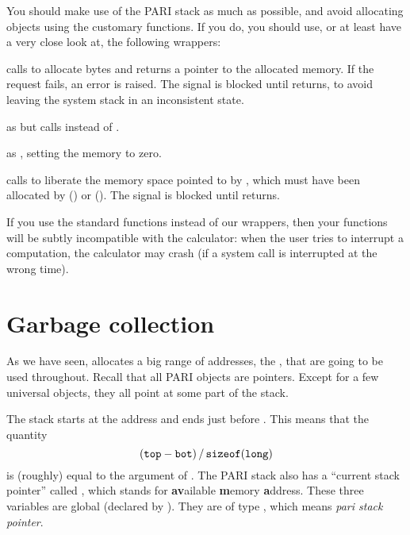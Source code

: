 You should make use of the PARI stack as much as possible, and avoid
allocating objects using the customary functions. If you do, you should
use, or at least have a very close look at, the following wrappers:

 calls  to allocate
 bytes and returns a pointer to the allocated memory. If the
request fails, an error is raised. The  signal is blocked until
 returns, to avoid leaving the system stack in an inconsistent
state.

 as  but
calls  instead of .

 as , setting the
memory to zero.

 calls  to liberate the memory
space pointed to by , which must have been allocated by 
() or  (). The 
signal is blocked until  returns.

If you use the standard  functions instead of our wrappers, then
your functions will be subtly incompatible with the  calculator: when
the user tries to interrupt a computation, the calculator may crash
(if a system call is interrupted at the wrong time).

\section{Garbage collection}\label{se:garbage}


\noindent
As we have seen,  allocates a big range of
addresses, the , that are going to be used throughout. Recall
that all PARI objects are pointers. Except for a few universal objects,
they all point at some part of the stack.

The stack starts at the address  and ends just before . This
means that the quantity
%
$$ ({\tt top} - {\tt bot})\,/\,{\tt sizeof(long)} $$
%
is (roughly) equal to the  argument of . The PARI
stack also has a ``current stack pointer'' called , which stands
for {\bf av}ailable {\bf m}emory {\bf a}ddress. These three variables are
global (declared by ). They are of type , which
means \emph{pari stack pointer}.

